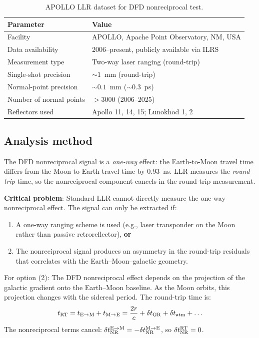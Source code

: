 \documentclass[11pt]{article}
\begin{document}
\begin{table}[H]
\centering
\caption{APOLLO LLR dataset for DFD nonreciprocal test.}
\begin{tabular}{ll}
\toprule
\textbf{Parameter} & \textbf{Value} \\
\midrule
Facility & APOLLO, Apache Point Observatory, NM, USA \\
Data availability & 2006--present, publicly available via ILRS \\
Measurement type & Two-way laser ranging (round-trip) \\
Single-shot precision & $\sim 1$~mm (round-trip) \\
Normal-point precision & $\sim 0.1$~mm ($\sim 0.3$~ps) \\
Number of normal points & $> 3000$ (2006--2025) \\
Reflectors used & Apollo 11, 14, 15; Lunokhod 1, 2 \\
\bottomrule
\end{tabular}
\end{table}

\subsection{Analysis method}

The DFD nonreciprocal signal is a \emph{one-way} effect: the
Earth-to-Moon travel time differs from the Moon-to-Earth travel time
by 0.93~ns. LLR measures the \emph{round-trip} time, so the nonreciprocal
component cancels in the round-trip measurement.

\textbf{Critical problem}: Standard LLR cannot directly measure the
one-way nonreciprocal effect. The signal can only be extracted if:
\begin{enumerate}[nosep]
\item A one-way ranging scheme is used (e.g., laser transponder on
  the Moon rather than passive retroreflector), \textbf{or}
\item The nonreciprocal signal produces an asymmetry in the round-trip
  residuals that correlates with the Earth--Moon--galactic geometry.
\end{enumerate}

For option (2): The DFD nonreciprocal effect depends on the projection
of the galactic gradient onto the Earth--Moon baseline. As the Moon
orbits, this projection changes with the sidereal period. The
round-trip time is:
\begin{equation}
t_{\rm RT} = t_{\rm E\to M} + t_{\rm M\to E}
= \frac{2r}{c} + \delta t_{\rm GR} + \delta t_{\rm atm} + \ldots
\end{equation}
The nonreciprocal terms cancel: $\delta t_{\rm NR}^{\rm E\to M}
= -\delta t_{\rm NR}^{\rm M\to E}$, so $\delta t_{\rm NR}^{\rm RT} = 0$.
\end{document}
